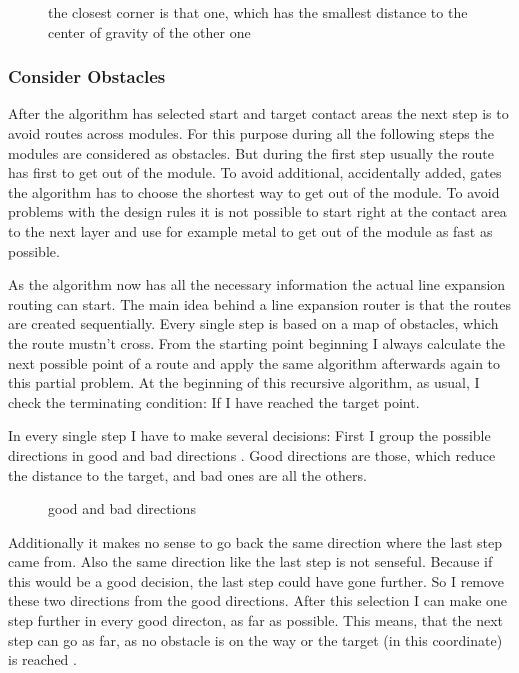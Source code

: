 \begin{figure}
	\centering
	
  	\caption{the closest corner is that one, which has the smallest distance to the center of gravity of the other one}
	\label{fig:rectangles_closest_corner}
\end{figure}

\subsubsection{Consider Obstacles}
After the algorithm has selected start and target contact areas the next step is to avoid routes across modules. For this purpose during all the following steps the modules are considered as obstacles. But during the first step usually the route has first to get out of the module. To avoid additional, accidentally added, gates the algorithm has to choose the shortest way to get out of the module. To avoid problems with the design rules it is not possible to start right at the contact area to the next layer and use for example metal to get out of the module as fast as possible.

As the algorithm now has all the necessary information the actual line expansion routing can start. The main idea behind a line expansion router is that the routes are created sequentially. Every single step is based on a map of obstacles, which the route mustn't cross. From the starting point beginning I always calculate the next possible point of a route and apply the same algorithm afterwards again to this partial problem. At the beginning of this recursive algorithm, as usual, I check the terminating condition: If I have reached the target point.

In every single step I have to make several decisions: First I group the possible directions in good and bad directions . Good directions are those, which reduce the distance to the target, and bad ones are all the others.

\begin{figure}
	\centering
	
  	\caption{good and bad directions}
	\label{fig:router_good_bad_direction}
\end{figure}

Additionally it makes no sense to go back the same direction where the last step came from. Also the same direction like the last step is not senseful. Because if this would be a good decision, the last step could have gone further. So I remove these two directions from the good directions. After this selection I can make one step further in every good directon, as far as possible. This means, that the next step can go as far, as no obstacle is on the way or the target (in this coordinate) is reached .

